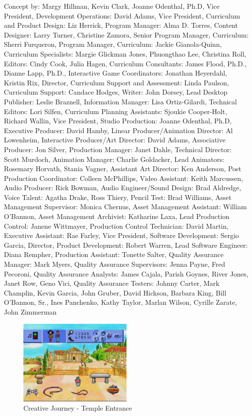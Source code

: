 Concept by: Margy Hillman, Kevin Clark, Joanne Odenthal, Ph.D,
Vice President, Development Operations: David Adams,
Vice President, Curriculum and Product Design: Liz Herrick,
Program Manager: Alma D. Torres,
Content Designer: Larry Turner, Christine Zamora,
Senior Program Manager, Curriculum: Sherri Furqueron,
Program Manager, Curriculum: Jackie Gianola-Quinn,
Curriculum Specialists: Margie Glickman Jones, Phuongthao Lee, Christina Roll,
Editors: Cindy Cook, Julia Hagen,
Curriculum Consultants: James Flood, Ph.D., Dianne Lapp, Ph.D.,
Interactive Game Coordinators: Jonathan Heyerdahl, Kristin Rix,
Director, Curriculum Support and Assessment: Linda Paulson,
Curriculum Support: Candace Hodges,
Writer: John Dorsey,
Lead Desktop Publisher: Leslie Braznell,
Information Manager: Lisa Ortiz-Gilardi,
Technical Editors: Lori Silfen,
Curriculum Planning Assistants: Sjoukie Cooper-Holt, Richard Wallin,
Vice President, Studio Production: Joanne Odenthal, Ph.D,
Executive Producer: David Hamby,
Linear Producer/Animation Director: Al Lowenheim,
Interactive Producer/Art Director: David Adams,
Associative Producer: Jon Silver,
Production Manager: Janet Dahle,
Technical Director: Scott Murdoch,
Animation Manager: Charlie Goldacker,
Lead Animators: Rosemary Horvath, Stania Vagner,
Assistant Art Director: Ken Anderson,
Post Production Coordinator: Colleen McPhillips,
Video Assistant: Keith Marcussen,
Audio Producer: Rick Bowman,
Audio Engineer/Sound Design: Brad Aldredge,
Voice Talent: Agatha Drake, Ross Thiery,
Pencil Test: Brad Williams,
Asset Management Supervisor: Monica Chernus,
Asset Management Assistant: William O'Bannon,
Asset Management Archivist: Katharine Laxa,
Lead Production Control: Janene Wittmayer,
Production Control Technician: David Martin,
Executive Assistant: Rae Farley,
Vice President, Software Development: Sergio Garcia,
Director, Product Development: Robert Warren,
Lead Software Engineer: Diana Rempher,
Production Assistant: Tonette Salter,
Quality Assurance Manager: Mark Myers,
Quality Assurance Supervisors: Jenna Payne, Fred Pecoroni,
Quality Assurance Analysts: James Cajala, Parish Goynes, River Jones, Janet Row, Geno Vici,
Quality Assurance Testers: Johnny Carter, Mark Champlin, Kevin Garcia, John Gruber, David Hickson, Barbara King, Bill O'Bannon, Sr., Ines Panchenko, Kathy Taylor, Marlan Wilson, Cyrille Zarate, John Zimmerman

\begin{figure}[H]
    \centering
    \includegraphics[width=0.5\textwidth]{"./Games/Creative/Images/CreativeJourneyScreenshot1.jpg"}
    \caption{Creative Journey - Temple Entrance}
\end{figure}


